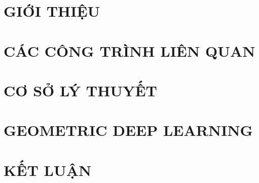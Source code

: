 \documentclass[a4paper, 12pt]{report}
\begin{document}
\renewcommand{\thepage}{\roman{page}}






%  
%
\newpage
%  
\setlength{\parskip}{0pt}


% 

% 

\tableofcontents
{}
\listoffigures  


\newpage 

\clearpage
\setcounter{page}{1}
\setcounter{chapter}{0}

\renewcommand{\thepage}{\arabic{page}}	

\setlength{\parskip}{1em}



\chapter{GIỚI THIỆU}


\chapter{CÁC CÔNG TRÌNH LIÊN QUAN}


\chapter{CƠ SỞ LÝ THUYẾT}



\chapter{GEOMETRIC DEEP LEARNING}


\chapter{KẾT LUẬN}




%

%    

    
    \printbibliography[title=Tài liệu tham khảo]
    
\end{document}
